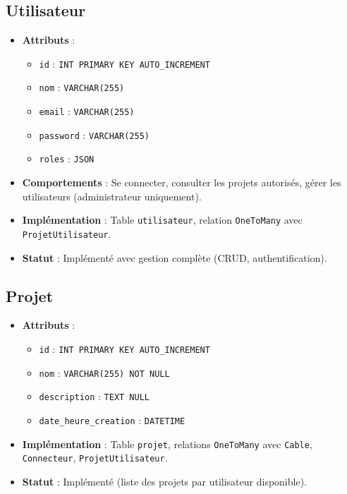 \documentclass[a4paper,12pt]{article}
\begin{document}
\subsection{Utilisateur}
\begin{itemize}
    \item \textbf{Attributs} :
    \begin{itemize}
        \item \texttt{id} : \texttt{INT PRIMARY KEY AUTO\_INCREMENT}
        \item \texttt{nom} : \texttt{VARCHAR(255)}
        \item \texttt{email} : \texttt{VARCHAR(255)}
        \item \texttt{password} : \texttt{VARCHAR(255)}
        \item \texttt{roles} : \texttt{JSON}
    \end{itemize}
    \item \textbf{Comportements} : Se connecter, consulter les projets autorisés, gérer les utilisateurs (administrateur uniquement).
    \item \textbf{Implémentation} : Table \texttt{utilisateur}, relation \texttt{OneToMany} avec \texttt{ProjetUtilisateur}.
    \item \textbf{Statut} : Implémenté avec gestion complète (CRUD, authentification).
\end{itemize}

\subsection{Projet}
\begin{itemize}
    \item \textbf{Attributs} :
    \begin{itemize}
        \item \texttt{id} : \texttt{INT PRIMARY KEY AUTO\_INCREMENT}
        \item \texttt{nom} : \texttt{VARCHAR(255) NOT NULL}
        \item \texttt{description} : \texttt{TEXT NULL}
        \item \texttt{date\_heure\_creation} : \texttt{DATETIME}
    \end{itemize}
    \item \textbf{Implémentation} : Table \texttt{projet}, relations \texttt{OneToMany} avec \texttt{Cable}, \texttt{Connecteur}, \texttt{ProjetUtilisateur}.
    \item \textbf{Statut} : Implémenté (liste des projets par utilisateur disponible).
\end{itemize}
\end{document}
